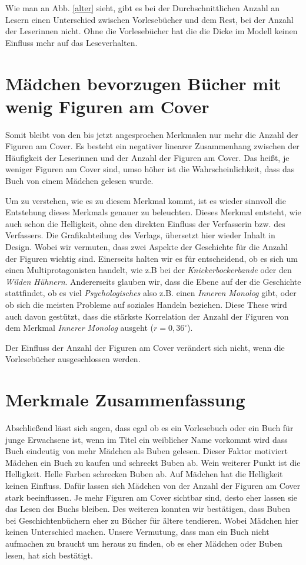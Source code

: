 Wie man an Abb. \ref{alter} sieht, gibt es bei der Durchschnittlichen
Anzahl an Lesern einen Unterschied zwischen Vorlesebücher und dem Rest,
bei der Anzahl der Leserinnen nicht. Ohne die Vorlesebücher hat die die
Dicke im Modell keinen Einfluss mehr auf das Leseverhalten.

\section{Mädchen bevorzugen Bücher mit wenig Figuren am Cover}

Somit bleibt von den bis jetzt angesprochen Merkmalen nur mehr die
Anzahl der Figuren am Cover. Es besteht ein negativer linearer
Zusammenhang zwischen der Häufigkeit der Leserinnen und der Anzahl der
Figuren am Cover. Das heißt, je weniger Figuren am Cover sind, umso
höher ist die Wahrscheinlichkeit, dass das Buch von einem Mädchen
gelesen wurde.

Um zu verstehen, wie es zu diesem Merkmal kommt, ist es wieder sinnvoll
die Entstehung dieses Merkmals genauer zu beleuchten. Dieses Merkmal
entsteht, wie auch schon die Helligkeit, ohne den direkten Einfluss der
Verfasserin bzw. des Verfassers. Die Grafikabteilung des Verlags,
übersetzt hier wieder Inhalt in Design. Wobei wir vermuten, dass zwei
Aspekte der Geschichte für die Anzahl der Figuren wichtig sind.
Einerseits halten wir es für entscheidend, ob es sich um einen
Multiprotagonisten handelt, wie z.B bei der \emph{Knickerbockerbande}
oder den \emph{Wilden Hühnern}. Andererseits glauben wir, dass die Ebene
auf der die Geschichte stattfindet, ob es viel \emph{Psychologisches}
also z.B. einen \emph{Inneren Monolog} gibt, oder ob sich die meisten
Probleme auf soziales Handeln beziehen. Diese These wird auch davon
gestützt, dass die stärkste Korrelation der Anzahl der Figuren von dem
Merkmal \emph{Innerer Monolog} ausgeht ($r=0{,}36^\circ$).

Der Einfluss der Anzahl der Figuren am Cover verändert sich nicht, wenn
die Vorlesebücher ausgeschlossen werden.

\section{Merkmale Zusammenfassung}

Abschließend lässt sich sagen, dass egal ob es ein Vorlesebuch oder ein
Buch für junge Erwachsene ist, wenn im Titel ein weiblicher Name
vorkommt wird dass Buch eindeutig von mehr Mädchen als Buben gelesen.
Dieser Faktor motiviert Mädchen ein Buch zu kaufen und schreckt Buben
ab. Wein weiterer Punkt ist die Helligkeit. Helle Farben schrecken Buben
ab. Auf Mädchen hat die Helligkeit keinen Einfluss. Dafür lassen sich
Mädchen von der Anzahl der Figuren am Cover stark beeinflussen. Je mehr
Figuren am Cover sichtbar sind, desto eher lassen sie das Lesen des
Buchs bleiben. Des weiteren konnten wir bestätigen, dass Buben bei
Geschichtenbüchern eher zu Bücher für ältere tendieren. Wobei Mädchen
hier keinen Unterschied machen. Unsere Vermutung, dass man ein Buch
nicht aufmachen zu braucht um heraus zu finden, ob es eher Mädchen oder
Buben lesen, hat sich bestätigt.

